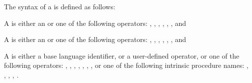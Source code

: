 \syntax
The syntax of a  is defined as follows:
\begin{cspecific} %
A  is either an  or one of the following operators:
\code{+},
\code{-},
\code{*},
\code{&},
\code{|},
\code{^},
\code{&&} and
\code{||}
\end{cspecific} %

\begin{cppspecific} %
A  is either an  or one of the following operators:
\code{+},
\code{-},
\code{*},
\code{&},
\code{|},
\code{^},
\code{&&} and
\code{||}
\end{cppspecific} %

\begin{fortranspecific}
A  is either a base language identifier, or a user-defined operator,
or one of the following operators:
\code{+},
\code{-},
\code{*},
,
,
,
,
 or one of the following intrinsic procedure names:
,
,
,
,
.
\end{fortranspecific}
%
%
